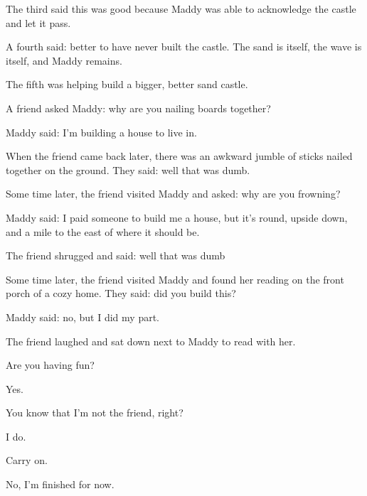 The third said this was good because Maddy was able to acknowledge the castle and let it pass.

A fourth said: better to have never built the castle. The sand is itself, the wave is itself, and Maddy remains.

The fifth was helping build a bigger, better sand castle.
\newpage

\noindent A friend asked Maddy: why are you nailing boards together?

Maddy said: I'm building a house to live in.

When the friend came back later, there was an awkward jumble of sticks nailed together on the ground. They said: well that was dumb.

Some time later, the friend visited Maddy and asked: why are you frowning?

Maddy said: I paid someone to build me a house, but it's round, upside down, and a mile to the east of where it should be.

The friend shrugged and said: well that was dumb

Some time later, the friend visited Maddy and found her reading on the front porch of a cozy home. They said: did you build this?

Maddy said: no, but I did my part.

The friend laughed and sat down next to Maddy to read with her.
\newpage
{}
\begin{ally}
Are you having fun?
\end{ally}
Yes.

\begin{ally}
You know that I'm not the friend, right?
\end{ally}
I do.

\begin{ally}
Carry on.
\end{ally}
No, I'm finished for now.
\newpage

